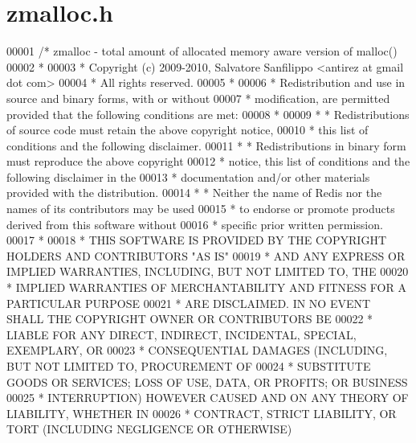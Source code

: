 \hypertarget{zmalloc_8h_source}{}\section{zmalloc.\+h}
\label{zmalloc_8h_source}

\begin{DoxyCode}
00001 \textcolor{comment}{/* zmalloc - total amount of allocated memory aware version of malloc()}
00002 \textcolor{comment}{ *}
00003 \textcolor{comment}{ * Copyright (c) 2009-2010, Salvatore Sanfilippo <antirez at gmail dot com>}
00004 \textcolor{comment}{ * All rights reserved.}
00005 \textcolor{comment}{ *}
00006 \textcolor{comment}{ * Redistribution and use in source and binary forms, with or without}
00007 \textcolor{comment}{ * modification, are permitted provided that the following conditions are met:}
00008 \textcolor{comment}{ *}
00009 \textcolor{comment}{ *   * Redistributions of source code must retain the above copyright notice,}
00010 \textcolor{comment}{ *     this list of conditions and the following disclaimer.}
00011 \textcolor{comment}{ *   * Redistributions in binary form must reproduce the above copyright}
00012 \textcolor{comment}{ *     notice, this list of conditions and the following disclaimer in the}
00013 \textcolor{comment}{ *     documentation and/or other materials provided with the distribution.}
00014 \textcolor{comment}{ *   * Neither the name of Redis nor the names of its contributors may be used}
00015 \textcolor{comment}{ *     to endorse or promote products derived from this software without}
00016 \textcolor{comment}{ *     specific prior written permission.}
00017 \textcolor{comment}{ *}
00018 \textcolor{comment}{ * THIS SOFTWARE IS PROVIDED BY THE COPYRIGHT HOLDERS AND CONTRIBUTORS "AS IS"}
00019 \textcolor{comment}{ * AND ANY EXPRESS OR IMPLIED WARRANTIES, INCLUDING, BUT NOT LIMITED TO, THE}
00020 \textcolor{comment}{ * IMPLIED WARRANTIES OF MERCHANTABILITY AND FITNESS FOR A PARTICULAR PURPOSE}
00021 \textcolor{comment}{ * ARE DISCLAIMED. IN NO EVENT SHALL THE COPYRIGHT OWNER OR CONTRIBUTORS BE}
00022 \textcolor{comment}{ * LIABLE FOR ANY DIRECT, INDIRECT, INCIDENTAL, SPECIAL, EXEMPLARY, OR}
00023 \textcolor{comment}{ * CONSEQUENTIAL DAMAGES (INCLUDING, BUT NOT LIMITED TO, PROCUREMENT OF}
00024 \textcolor{comment}{ * SUBSTITUTE GOODS OR SERVICES; LOSS OF USE, DATA, OR PROFITS; OR BUSINESS}
00025 \textcolor{comment}{ * INTERRUPTION) HOWEVER CAUSED AND ON ANY THEORY OF LIABILITY, WHETHER IN}
00026 \textcolor{comment}{ * CONTRACT, STRICT LIABILITY, OR TORT (INCLUDING NEGLIGENCE OR OTHERWISE)}

\end{DoxyCode}

